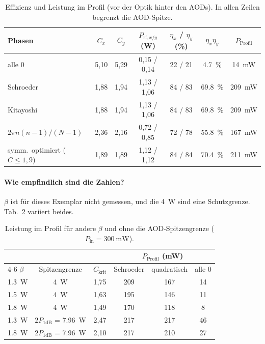 \documentclass[11pt,a4paper]{article}
\newcommand{\Pone}{P_{\mathrm{1dB}}}
\newcommand{\Ckrit}{C_{\mathrm{krit}}}
\begin{document}
\begin{table}[htbp]
\centering\small
\begin{tabular}{lcccccc}
\toprule
Phasen & $C_x$ & $C_y$ & $P_{\mathrm{rf},x/y}$ (W) & $\eta_x$ / $\eta_y$ (\%) & $\eta_x\eta_y$ & $P_\mathrm{Profil}$\\
\midrule
alle 0            & 5,10 & 5,29 & 0,15 / 0,14 & 22 / 21 & \SI{4,7}{\percent} & \SI{14}{\milli\watt}\\
Schroeder         & 1,88 & 1,94 & 1,13 / 1,06 & 84 / 83 & \SI{69,8}{\percent} & \SI{209}{\milli\watt}\\
Kitayoshi         & 1,88 & 1,94 & 1,13 / 1,06 & 84 / 83 & \SI{69,8}{\percent} & \SI{209}{\milli\watt}\\
$2\pi n(n-1)/(N-1)$ & 2,36 & 2,16 & 0,72 / 0,85 & 72 / 78 & \SI{55,8}{\percent} & \SI{167}{\milli\watt}\\
symm.\ optimiert ($C\le1{,}9$) & 1,89 & 1,89 & 1,12 / 1,12 & 84 / 84 & \SI{70,4}{\percent} & \SI{211}{\milli\watt}\\
\bottomrule
\end{tabular}
\caption{Effizienz und Leistung im Profil (vor der Optik hinter den AODs). In
allen Zeilen begrenzt die AOD-Spitze.}
\label{tab:zahlen}
\end{table}

\paragraph{Wie empfindlich sind die Zahlen?} $\beta$ ist für dieses Exemplar nicht
gemessen, und die \SI{4}{\watt} sind eine Schutzgrenze. Tab.~\ref{tab:sens}
variiert beides.

\begin{table}[htbp]
\centering\small
\begin{tabular}{lccccc}
\toprule
& & & \multicolumn{3}{c}{$P_\mathrm{Profil}$ (mW)}\\
\cmidrule(lr){4-6}
$\beta$ & Spitzengrenze & $\Ckrit$ & Schroeder & quadratisch & alle 0\\
\midrule
\SI{1,3}{\watt} & \SI{4}{\watt}   & 1,75 & 209 & 167 & 14\\
\SI{1,5}{\watt} & \SI{4}{\watt}   & 1,63 & 195 & 146 & 11\\
\SI{1,8}{\watt} & \SI{4}{\watt}   & 1,49 & 170 & 118 & 8\\
\SI{1,3}{\watt} & $2\Pone$ = \SI{7,96}{\watt} & 2,47 & 217 & 217 & 46\\
\SI{1,8}{\watt} & $2\Pone$ = \SI{7,96}{\watt} & 2,10 & 217 & 210 & 27\\
\bottomrule
\end{tabular}
\caption{Leistung im Profil für andere $\beta$ und ohne die AOD-Spitzengrenze
($P_\mathrm{in}=\SI{300}{\milli\watt}$).}
\label{tab:sens}
\end{table}
\end{document}
